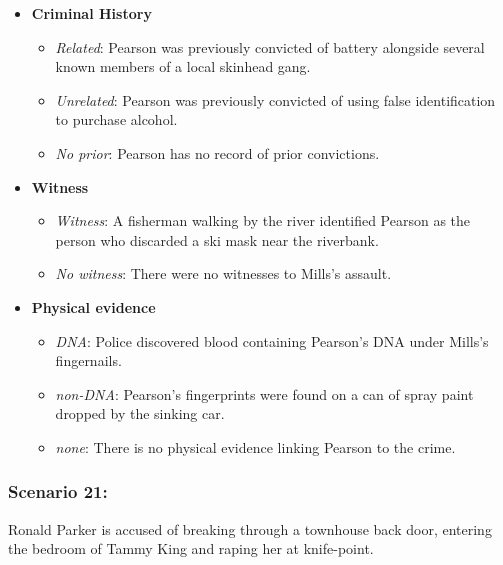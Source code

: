 \documentclass[
]{article}
\providecommand{\tightlist}{%
  \setlength{\itemsep}{0pt}\setlength{\parskip}{0pt}}
\begin{document}
\begin{itemize}
\tightlist
\item
  \textbf{Criminal History}

  \begin{itemize}
  \tightlist
  \item
    \emph{Related}: Pearson was previously convicted of battery
    alongside several known members of a local skinhead gang.
  \item
    \emph{Unrelated}: Pearson was previously convicted of using false
    identification to purchase alcohol.
  \item
    \emph{No prior}: Pearson has no record of prior convictions.
  \end{itemize}
\item
  \textbf{Witness}

  \begin{itemize}
  \tightlist
  \item
    \emph{Witness}: A fisherman walking by the river identified Pearson
    as the person who discarded a ski mask near the riverbank.
  \item
    \emph{No witness}: There were no witnesses to Mills's assault.
  \end{itemize}
\item
  \textbf{Physical evidence}

  \begin{itemize}
  \tightlist
  \item
    \emph{DNA}: Police discovered blood containing Pearson's DNA under
    Mills's fingernails.
  \item
    \emph{non-DNA}: Pearson's fingerprints were found on a can of spray
    paint dropped by the sinking car.
  \item
    \emph{none}: There is no physical evidence linking Pearson to the
    crime.
  \end{itemize}
\end{itemize}

\hypertarget{scenario-21}{%
\subsubsection{Scenario 21:}\label{scenario-21}}

Ronald Parker is accused of breaking through a townhouse back door,
entering the bedroom of Tammy King and raping her at knife-point.
\end{document}
